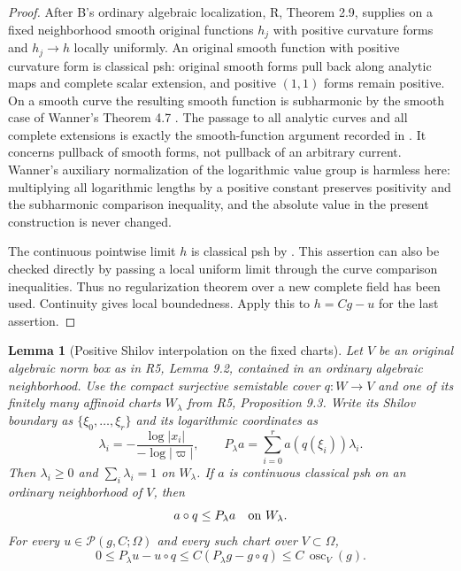 \documentclass[11pt,a4paper]{article}
\numberwithin{equation}{section}
\newtheorem{lemma}[theorem]{Lemma}
\theoremstyle{definition}
\theoremstyle{remark}
\begin{document}
\begin{proof}
After B's ordinary algebraic localization, R, Theorem 2.9, supplies
on a fixed neighborhood smooth original functions $h_j$ with positive
curvature forms and $h_j\to h$ locally uniformly. An original smooth
function with positive curvature form is classical psh: original
smooth forms pull back along analytic maps and complete scalar
extension, and positive $(1,1)$ forms remain positive. On a smooth
curve the resulting smooth function is subharmonic by the smooth case
of Wanner's Theorem 4.7 \cite{Wan19}. The passage to all analytic
curves and all complete extensions is exactly the smooth-function
argument recorded in \cite[\S1.2, p.~3; \S4.1.3]{GR25}.
It concerns pullback of smooth forms, not pullback of an arbitrary
current. Wanner's auxiliary normalization of the logarithmic value
group is harmless here: multiplying all logarithmic lengths by a
positive constant preserves positivity and the subharmonic comparison
inequality, and the absolute value in the present construction is
never changed.

The continuous pointwise limit $h$ is classical psh by
\cite[Theorem 6.5]{GR25}. This assertion can also be checked directly
by passing a local uniform limit through the curve comparison
inequalities. Thus no regularization theorem over a new complete
field has been used. Continuity gives local boundedness. Apply this
to $h=Cg-u$ for the last assertion.
\end{proof}

\begin{lemma}[Positive Shilov interpolation on the fixed charts]
\label{lem:r6-positive-shilov-interpolation}
Let $V$ be an original algebraic norm box as in R5, Lemma 9.2,
contained in an ordinary algebraic neighborhood. Use the compact
surjective semistable cover $q:W\to V$ and one of its finitely many
affinoid charts $W_\lambda$ from R5, Proposition 9.3. Write its
Shilov boundary as $\{\xi_0,\ldots,\xi_r\}$ and its logarithmic
coordinates as
\[
 \lambda_i=-\frac{\log|x_i|}{-\log|\varpi|},
 \qquad P_\lambda a=\sum_{i=0}^r a(q(\xi_i))\lambda_i.
\]
Then $\lambda_i\geq0$ and $\sum_i\lambda_i=1$ on $W_\lambda$.
If $a$ is continuous classical psh on an ordinary neighborhood of
$V$, then
\[
                  a\circ q\leq P_\lambda a\quad\hbox{on }W_\lambda.
\]
For every $u\in\mathscr P(g,C;\Omega)$ and every such chart over
$V\subset\Omega$,
\begin{equation}
 0\leq P_\lambda u-u\circ q
       \leq C(P_\lambda g-g\circ q)
       \leq C\,\operatorname{osc}_V(g).
 \label{eq:r6-shilov-order-error}
\end{equation}
\end{lemma}
\end{document}

